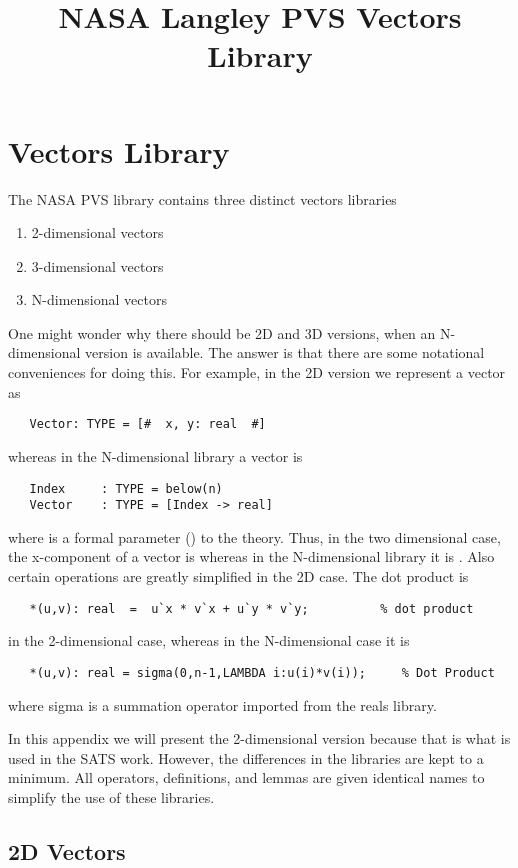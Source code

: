 \documentclass[12pt]{article}
\begin{document}
\title{NASA Langley PVS Vectors Library}


\newpage
\section{Vectors Library}

The NASA PVS library contains three distinct vectors libraries
\begin{enumerate}
\item 2-dimensional vectors
\item 3-dimensional vectors
\item N-dimensional vectors
\end{enumerate}
One might wonder why there should be 2D and 3D versions, when an N-dimensional
version is available.  The answer is that there are some notational
conveniences for doing this.  For example, in the 2D version we represent
a vector as 
\begin{verbatim}
   Vector: TYPE = [#  x, y: real  #]
\end{verbatim}
whereas in the N-dimensional library a vector is
\begin{verbatim}
   Index     : TYPE = below(n) 
   Vector    : TYPE = [Index -> real]
\end{verbatim}
where  is a formal parameter () to the theory.
Thus, in the two dimensional case, the x-component of a vector  is
 whereas in the N-dimensional library it is .  Also
certain operations are greatly simplified in the 2D case.  The dot
product is
\begin{verbatim}
   *(u,v): real  =  u`x * v`x + u`y * v`y;          % dot product
\end{verbatim}
in the 2-dimensional case, whereas in the N-dimensional case it is
\begin{verbatim}
   *(u,v): real = sigma(0,n-1,LAMBDA i:u(i)*v(i));     % Dot Product
\end{verbatim}
where sigma is a summation operator imported from the reals library.

In this appendix we will present the 2-dimensional version because
that is what is used in the SATS work.  However, the differences in
the libraries are kept to a minimum.  All operators, definitions,
and lemmas are given identical names to simplify the use of these
libraries.

\subsection{2D Vectors}
\end{document}
